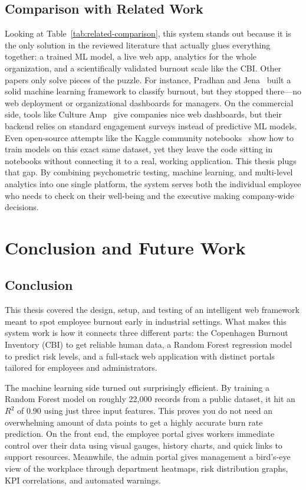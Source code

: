 \documentclass[12pt,a4paper]{article}
\begin{document}
\subsection{Comparison with Related Work}

Looking at Table~\ref{tab:related-comparison}, this system stands out because it is the only solution in the reviewed literature that actually glues everything together: a trained ML model, a live web app, analytics for the whole organization, and a scientifically validated burnout scale like the CBI. Other papers only solve pieces of the puzzle. For instance, Pradhan and Jena~\cite{pradhan2019} built a solid machine learning framework to classify burnout, but they stopped there—no web deployment or organizational dashboards for managers. On the commercial side, tools like Culture Amp~\cite{cultureamp2024} give companies nice web dashboards, but their backend relies on standard engagement surveys instead of predictive ML models. Even open-source attempts like the Kaggle community notebooks~\cite{kaggle2021} show how to train models on this exact same dataset, yet they leave the code sitting in notebooks without connecting it to a real, working application. This thesis plugs that gap. By combining psychometric testing, machine learning, and multi-level analytics into one single platform, the system serves both the individual employee who needs to check on their well-being and the executive making company-wide decisions.


\clearpage
\section{Conclusion and Future Work}

\subsection{Conclusion}

This thesis covered the design, setup, and testing of an intelligent web framework meant to spot employee burnout early in industrial settings. What makes this system work is how it connects three different parts: the Copenhagen Burnout Inventory (CBI) to get reliable human data, a Random Forest regression model to predict risk levels, and a full-stack web application with distinct portals tailored for employees and administrators.

The machine learning side turned out surprisingly efficient. By training a Random Forest model on roughly 22{,}000 records from a public dataset, it hit an $R^{2}$ of 0.90 using just three input features. This proves you do not need an overwhelming amount of data points to get a highly accurate burn rate prediction. On the front end, the employee portal gives workers immediate control over their data using visual gauges, history charts, and quick links to support resources. Meanwhile, the admin portal gives management a bird's-eye view of the workplace through department heatmaps, risk distribution graphs, KPI correlations, and automated warnings.
\end{document}
